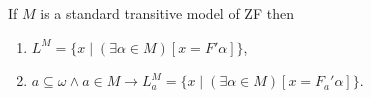 If $M$ is a standard transitive model of ZF then
\begin{enumerate}
\item $L^M = \{x \mid (\exists \alpha \in M)[x = F' \alpha]\}$,
\item $a \subseteq \omega \land a \in M \rightarrow L_a^M = \{x \mid (\exists \alpha \in M)[x = F_a' \alpha]\}$.
\end{enumerate}
